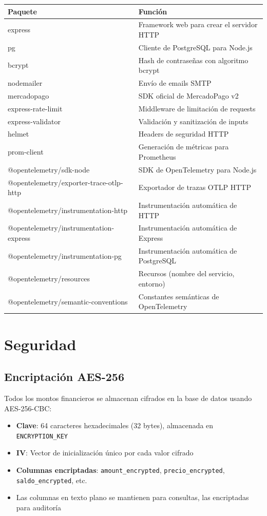 \documentclass[12pt,oneside]{article}
\begin{document}
\begin{longtable}{|p{5cm}|p{10cm}|}
\hline
\textbf{Paquete} & \textbf{Función} \\
\hline
express & Framework web para crear el servidor HTTP \\
pg & Cliente de PostgreSQL para Node.js \\
bcrypt & Hash de contraseñas con algoritmo bcrypt \\
nodemailer & Envío de emails SMTP \\
mercadopago & SDK oficial de MercadoPago v2 \\
express-rate-limit & Middleware de limitación de requests \\
express-validator & Validación y sanitización de inputs \\
helmet & Headers de seguridad HTTP \\
prom-client & Generación de métricas para Prometheus \\
@opentelemetry/sdk-node & SDK de OpenTelemetry para Node.js \\
@opentelemetry/exporter-trace-otlp-http & Exportador de trazas OTLP HTTP \\
@opentelemetry/instrumentation-http & Instrumentación automática de HTTP \\
@opentelemetry/instrumentation-express & Instrumentación automática de Express \\
@opentelemetry/instrumentation-pg & Instrumentación automática de PostgreSQL \\
@opentelemetry/resources & Recursos (nombre del servicio, entorno) \\
@opentelemetry/semantic-conventions & Constantes semánticas de OpenTelemetry \\
\hline
\end{longtable}

\section{Seguridad}

\subsection{Encriptación AES-256}

Todos los montos financieros se almacenan cifrados en la base de datos usando AES-256-CBC:

\begin{itemize}
    \item \textbf{Clave}: 64 caracteres hexadecimales (32 bytes), almacenada en \texttt{ENCRYPTION\_KEY}
    \item \textbf{IV}: Vector de inicialización único por cada valor cifrado
    \item \textbf{Columnas encriptadas}: \texttt{amount\_encrypted}, \texttt{precio\_encrypted}, \texttt{saldo\_encrypted}, etc.
    \item Las columnas en texto plano se mantienen para consultas, las encriptadas para auditoría
\end{itemize}
\end{document}
